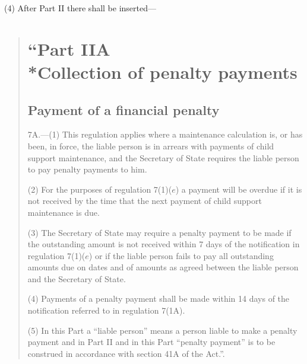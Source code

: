 \documentclass[12pt,a4paper]{article}
\begin{document}
(4) After Part II there shall be inserted—
\begin{quotation}
\section*{“Part IIA\\*C\lowercase{OLLECTION OF PENALTY PAYMENTS}}

\subsection*{Payment of a financial penalty}

7A.---(1)  This regulation applies where a maintenance calculation is, or has been, in force, the liable person is in arrears with payments of child support maintenance, and the Secretary of State requires the liable person to pay penalty payments to him.

(2) For the purposes of regulation 7(1)($e$)  a payment will be overdue if it is not received by the time that the next payment of child support maintenance is due.

(3) The Secretary of State may require a penalty payment to be made if the outstanding amount is not received within 7 days of the notification in regulation 7(1)($e$)  or if the liable person fails to pay all outstanding amounts due on dates and of amounts as agreed between the liable person and the Secretary of State.

(4) Payments of a penalty payment shall be made within 14 days of the notification referred to in regulation 7(1A).

(5) In this Part a “liable person” means a person liable to make a penalty payment and in Part II and in this Part “penalty payment” is to be construed in accordance with section 41A of the Act.”.
\end{quotation}
\end{document}
